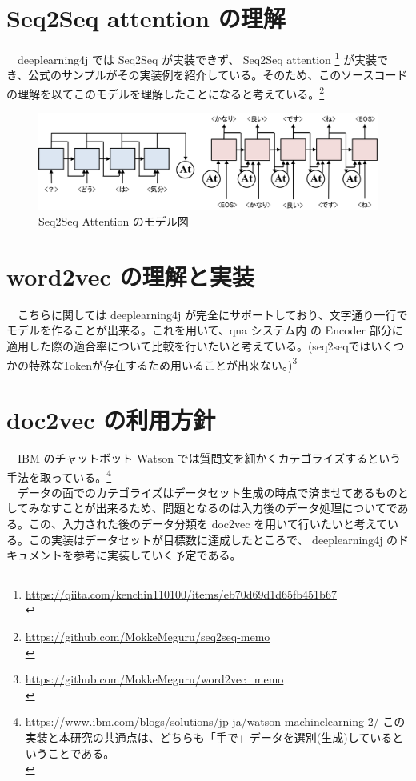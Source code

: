\documentclass{scrartcl}
\begin{document}
\section{Seq2Seq attention の理解}
\label{sec:orgddd7f93}
　deeplearning4j では Seq2Seq が実装できず、 Seq2Seq attention \footnote{\url{https://qiita.com/kenchin110100/items/eb70d69d1d65fb451b67}\\} が実装でき、公式のサンプルがその実装例を紹介している。そのため、このソースコードの理解を以てこのモデルを理解したことになると考えている。\footnote{\url{https://github.com/MokkeMeguru/seq2seq-memo}\\}\\

\begin{figure}[htbp]
\centering
\includegraphics[width=12cm]{./seq2seq_att.png}
\caption{\label{fig:org483d507}
Seq2Seq Attention のモデル図}
\end{figure}

\section{word2vec の理解と実装}
\label{sec:org74992ff}
　こちらに関しては deeplearning4j が完全にサポートしており、文字通り一行でモデルを作ることが出来る。これを用いて、qna システム内 の Encoder 部分に適用した際の適合率について比較を行いたいと考えている。(seq2seqではいくつかの特殊なTokenが存在するため用いることが出来ない。)\footnote{\url{https://github.com/MokkeMeguru/word2vec\_memo}\\}\\

\section{doc2vec の利用方針}
\label{sec:org3dbdd3c}
　IBM のチャットボット Watson では質問文を細かくカテゴライズするという手法を取っている。\footnote{\url{https://www.ibm.com/blogs/solutions/jp-ja/watson-machinelearning-2/} この実装と本研究の共通点は、どちらも「手で」データを選別(生成)しているということである。\\}\\
　データの面でのカテゴライズはデータセット生成の時点で済ませてあるものとしてみなすことが出来るため、問題となるのは入力後のデータ処理についてである。この、入力された後のデータ分類を doc2vec を用いて行いたいと考えている。この実装はデータセットが目標数に達成したところで、 deeplearning4j のドキュメントを参考に実装していく予定である。\\
\end{document}
